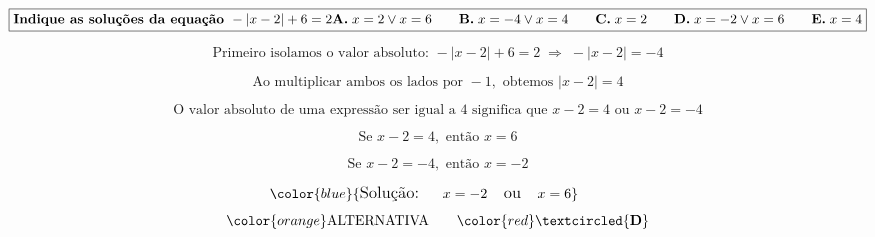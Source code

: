 

\[
\boxed{\textbf{Indique as soluções da equação } -|x - 2| + 6 = 2 \\
\\
\textbf{A.} \; x = 2 \vee x = 6
\quad\quad
\textbf{B.} \; x = -4 \vee x = 4
\quad\quad
\textbf{C.} \; x = 2
\quad\quad
\textbf{D.} \; x = -2 \vee x = 6
\quad\quad
\textbf{E.} \; x = 4}

\]







\[
\text{Primeiro isolamos o valor absoluto: } -|x - 2| + 6 = 2 \;\Rightarrow\; -|x - 2| = -4
\]





\[
\text{Ao multiplicar ambos os lados por } -1, \text{ obtemos } |x - 2| = 4
\]





\[
\text{O valor absoluto de uma expressão ser igual a 4 significa que } x - 2 = 4 \text{ ou } x - 2 = -4
\]





\[
\text{Se } x - 2 = 4, \text{ então } x = 6
\]





\[
\text{Se } x - 2 = -4, \text{ então } x = -2
\]







\[
\color{blue}{\large {\text{Solução: }\quad x = -2 \quad \text{ou} \quad x = 6}}
 \quad\quad  \]
\[\color{orange}\text{ALTERNATIVA}  \quad\quad \color{red} 


\textcircled{\textbf{D}}



\]
 






